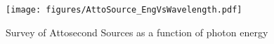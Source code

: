 \documentclass{article}
\begin{document}
\begin{figure}
    \centering
    \texttt{[image: figures/AttoSource\_EngVsWavelength.pdf]}
    \caption{Survey of Attosecond Sources as a function of photon energy}  
    \label{fig:AttoSource}
\end{figure}


\end{document}
